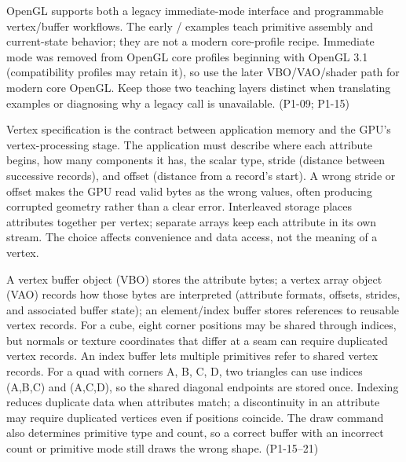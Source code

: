 OpenGL supports both a legacy immediate-mode interface and programmable vertex/buffer workflows. The early / examples teach primitive assembly and current-state behavior; they are not a modern core-profile recipe. Immediate mode was removed from OpenGL core profiles beginning with OpenGL 3.1 (compatibility profiles may retain it), so use the later VBO/VAO/shader path for modern core OpenGL. Keep those two teaching layers distinct when translating examples or diagnosing why a legacy call is unavailable. (P1-09; P1-15)

Vertex specification is the contract between application memory and the GPU's vertex-processing stage. The application must describe where each attribute begins, how many components it has, the scalar type, stride (distance between successive records), and offset (distance from a record's start). A wrong stride or offset makes the GPU read valid bytes as the wrong values, often producing corrupted geometry rather than a clear error. Interleaved storage places attributes together per vertex; separate arrays keep each attribute in its own stream. The choice affects convenience and data access, not the meaning of a vertex.

A vertex buffer object (VBO) stores the attribute bytes; a vertex array object (VAO) records how those bytes are interpreted (attribute formats, offsets, strides, and associated buffer state); an element/index buffer stores references to reusable vertex records. For a cube, eight corner positions may be shared through indices, but normals or texture coordinates that differ at a seam can require duplicated vertex records. An index buffer lets multiple primitives refer to shared vertex records. For a quad with corners A, B, C, D, two triangles can use indices (A,B,C) and (A,C,D), so the shared diagonal endpoints are stored once. Indexing reduces duplicate data when attributes match; a discontinuity in an attribute may require duplicated vertices even if positions coincide. The draw command also determines primitive type and count, so a correct buffer with an incorrect count or primitive mode still draws the wrong shape. (P1-15--21)

